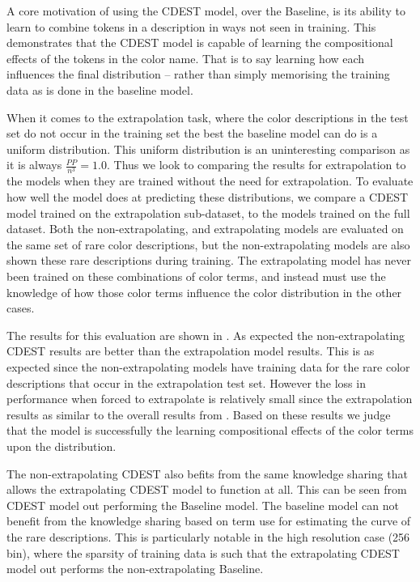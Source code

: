 \documentclass[11pt,letterpaper]{article}
\begin{document}
A core motivation of using the CDEST model, over the Baseline, is its ability to learn to combine tokens in a description in ways not seen in training.
This demonstrates that the CDEST model is capable of learning the compositional effects of the tokens in the color name.
That is to say learning how each influences the final distribution -- rather than simply memorising the training data as is done in the baseline model.

When it comes to the extrapolation task, where the color descriptions in the test set do not occur in the training set the best the baseline model can do is a uniform distribution.
This uniform distribution is an uninteresting comparison as it is always $\frac{PP}{n^3}=1.0$.
Thus we look to comparing the results for extrapolation to the models when they are trained without the need for extrapolation.
To evaluate how well the model does at predicting these distributions,
we compare a CDEST model trained on the extrapolation sub-dataset, to the models trained on the full dataset.
Both the non-extrapolating, and extrapolating models are evaluated on the same set of rare color descriptions,
but the non-extrapolating models are also shown these rare descriptions during training.
The extrapolating model has never been trained on these combinations of color terms,
and instead must use the knowledge of how those color terms influence the color distribution in the other cases.

The results for this evaluation are shown in .
As expected the non-extrapolating CDEST results are better than the extrapolation model results.
This is as expected since the non-extrapolating models have training data for the rare color descriptions that occur in the extrapolation test set.
However the loss in performance when forced to extrapolate is relatively small since the extrapolation results as similar to the overall results from .
Based on these results we judge that the model is successfully the learning compositional effects of the color terms upon the distribution.

The non-extrapolating CDEST also befits from the same knowledge sharing that allows the extrapolating CDEST model to function at all.
This can be seen from CDEST model out performing the Baseline model.
The baseline model can not benefit from the knowledge sharing based on term use for estimating the curve of the rare descriptions.
This is particularly notable in the high resolution case (256 bin),
where the sparsity of training data is such that the extrapolating CDEST model out performs the non-extrapolating Baseline.
\end{document}
